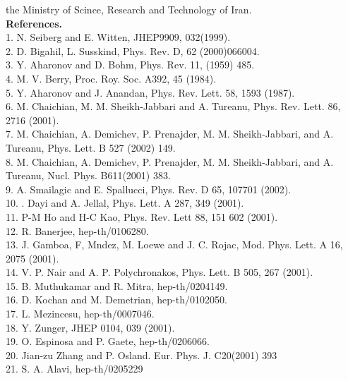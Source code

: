 \documentclass[a4paper,a4paper]{article}
\begin{document}
the Ministry of Scince, Research and Technology of Iran.\\
\textbf{References.}\\
1. N. Seiberg and E. Witten, JHEP9909, 032(1999). \\
2. D. Bigahil, L. Susskind, Phys. Rev. D, 62 (2000)066004. \\
3. Y. Aharonov and D. Bohm, Phys. Rev. 11, (1959) 485.\\
4. M. V. Berry, Proc. Roy. Soc. A392, 45 (1984).\\
5. Y. Aharonov and J. Anandan, Phys. Rev. Lett. 58, 1593 (1987).\\
6. M. Chaichian, M. M. Sheikh-Jabbari and A. Tureanu, Phys. Rev.
Lett. 86, 2716 (2001).\\
7. M. Chaichian, A. Demichev, P. Pre\coordHE{}najder, M. M.
Sheikh-Jabbari, and A. Tureanu, Phys. Lett. B 527 (2002) 149.\\
8. M. Chaichian, A. Demichev, P. Pre\coordHE{}najder, M. M.
Sheikh-Jabbari, and A. Tureanu, Nucl. Phys. B611(2001) 383.\\
9. A. Smailagic and E. Spallucci, Phys. Rev. D 65, 107701
(2002).\\
10. \coordHE{}. Dayi and A. Jellal, Phys. Lett. A 287, 349
(2001).\\
11. P-M Ho and H-C Kao, Phys. Rev. Lett 88, 151 602 (2001).\\
12. R. Banerjee, hep-th/0106280. \\
13. J. Gamboa, F, M\coordHE{}ndez, M. Loewe and J. C. Rojac, Mod.
Phys. Lett. A 16, 2075 (2001).\\
14. V. P. Nair and A. P. Polychronakos, Phys. Lett. B 505, 267
(2001).\\
15. B. Muthukamar and R. Mitra, hep-th/0204149.\\
16. D. Kochan and M. Demetrian, hep-th/0102050.\\
17. L. Mezincesu, hep-th/0007046.\\
18. Y. Zunger, JHEP 0104, 039 (2001).\\
19. O. Espinosa and P. Gaete, hep-th/0206066.\\
20. Jian-zu Zhang and P. Osland. Eur. Phys. J. C20(2001) 393\\
21. S. A. Alavi, hep-th/0205229
\end{document}

